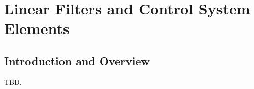\chapter{Linear Filters and Control System Elements}
\label{clfc0}

\section{Introduction and Overview}
\label{clfc0:siov0}

TBD.

